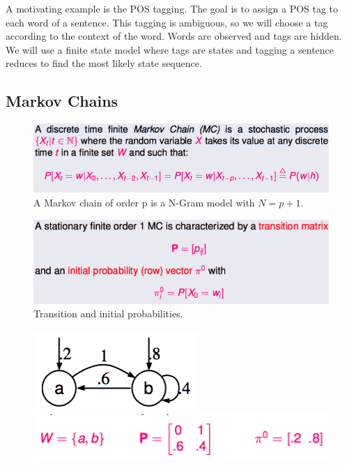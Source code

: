 
A motivating example is the POS tagging. The goal is to assign a POS tag to each word of a sentence. This tagging is ambiguous, so we will choose a tag according to the context of the word. Words are observed and tags are hidden. We will use a finite state model where tags are states and tagging a sentence reduces to find the most likely state sequence.

\subsection{Markov Chains}

\begin{figure}[htp]
	\centering
	\includegraphics[scale=0.5]{images/22_chains.png}
 	\caption{A Markov chain of order p is a N-Gram model with $N = p+1$. }
\end{figure}

\begin{figure}[htp]
	\centering
	\includegraphics[scale=0.6]{images/23_prob.png}
 	\caption{Transition and initial probabilities.}
\end{figure}


\begin{figure}
\centering
\begin{minipage}{.5\textwidth}
  \centering
  \includegraphics[scale=0.6]{images/24_ex1.png}
\end{minipage}%
\begin{minipage}{.5\textwidth}
  \centering
  \includegraphics[scale=0.5]{images/25_ex2.png}
\end{minipage}
\end{figure}

